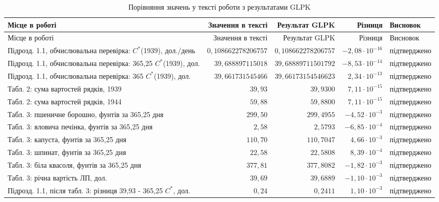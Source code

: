 {\scriptsize\setlength{\tabcolsep}{3pt}
\begin{longtable}{>{\raggedright}p{4.3cm}rrr>{\raggedright\arraybackslash}p{2.3cm}}
\caption{Порівняння значень у тексті роботи з результатами GLPK}\label{tab:glpk-comparison}\\
\toprule
Місце в роботі & Значення в тексті & Результат GLPK & Різниця & Висновок \\
\midrule
\endfirsthead
\toprule
Місце в роботі & Значення в тексті & Результат GLPK & Різниця & Висновок \\
\midrule
\endhead
\bottomrule
\endfoot
Підрозд. 1.1, обчислювальна перевірка: $C^*$(1939), дол./день & $0{,}108662278206757$ & $0{,}108662278206757$ & $-2{,}08\cdot10^{-16}$ & підтверджено \\
Підрозд. 1.1, обчислювальна перевірка: 365{,}25 $C^*$(1939), дол. & $39{,}688897115018$ & $39{,}68889711501792$ & $-8{,}53\cdot10^{-14}$ & підтверджено \\
Підрозд. 1.1, обчислювальна перевірка: 365 $C^*$(1939), дол. & $39{,}661731545466$ & $39{,}66173154546623$ & $2{,}34\cdot10^{-13}$ & підтверджено \\
Табл. 2: сума вартостей рядків, 1939 & $39{,}93$ & $39{,}9300$ & $7{,}11\cdot10^{-15}$ & підтверджено \\
Табл. 2: сума вартостей рядків, 1944 & $59{,}88$ & $59{,}8800$ & $7{,}11\cdot10^{-15}$ & підтверджено \\
Табл. 3: пшеничне борошно, фунтів за 365{,}25 дня & $299{,}50$ & $299{,}4955$ & $-4{,}52\cdot10^{-3}$ & підтверджено \\
Табл. 3: яловича печінка, фунтів за 365{,}25 дня & $2{,}58$ & $2{,}5793$ & $-6{,}85\cdot10^{-4}$ & підтверджено \\
Табл. 3: капуста, фунтів за 365{,}25 дня & $110{,}70$ & $110{,}7047$ & $4{,}66\cdot10^{-3}$ & підтверджено \\
Табл. 3: шпинат, фунтів за 365{,}25 дня & $22{,}58$ & $22{,}5808$ & $8{,}39\cdot10^{-4}$ & підтверджено \\
Табл. 3: біла квасоля, фунтів за 365{,}25 дня & $377{,}81$ & $377{,}8082$ & $-1{,}82\cdot10^{-3}$ & підтверджено \\
Табл. 3: річна вартість ЛП, дол. & $39{,}69$ & $39{,}6889$ & $-1{,}10\cdot10^{-3}$ & підтверджено \\
Підрозд. 1.1, після табл. 3: різниця 39{,}93 - 365{,}25 $C^*$, дол. & $0{,}24$ & $0{,}2411$ & $1{,}10\cdot10^{-3}$ & підтверджено \\

\end{longtable}}
